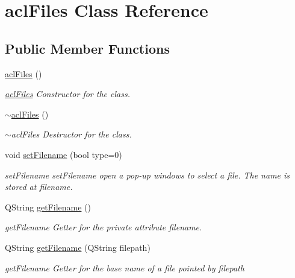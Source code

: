 \hypertarget{classaclFiles}{}\section{acl\+Files Class Reference}
\label{classaclFiles}
\subsection*{Public Member Functions}
\begin{DoxyCompactItemize}
\item 
\mbox{\label{classaclFiles_a624023b49f732728e4afea7e34e35ca9}} 
\hyperlink{classaclFiles_a624023b49f732728e4afea7e34e35ca9}{acl\+Files} ()
\begin{DoxyCompactList}\small\item\em \hyperlink{classaclFiles}{acl\+Files} Constructor for the class. \end{DoxyCompactList}\item 
\mbox{\label{classaclFiles_a775b6e59428624ce37d432d01b9b2421}} 
\hyperlink{classaclFiles_a775b6e59428624ce37d432d01b9b2421}{$\sim$acl\+Files} ()
\begin{DoxyCompactList}\small\item\em $\sim$acl\+Files Destructor for the class. \end{DoxyCompactList}\item 
void \hyperlink{classaclFiles_aa2948bd2ae50c0cd073da7ce73c5cbc5}{set\+Filename} (bool type=0)
\begin{DoxyCompactList}\small\item\em set\+Filename set\+Filename open a pop-\/up windows to select a file. The name is stored at filename. \end{DoxyCompactList}\item 
Q\+String \hyperlink{classaclFiles_a3ef3210f1bb426a0d4c02867780d861f}{get\+Filename} ()
\begin{DoxyCompactList}\small\item\em get\+Filename Getter for the private attribute filename. \end{DoxyCompactList}\item 
Q\+String \hyperlink{classaclFiles_a827c8b42e03850775de3feef9e14885d}{get\+Filename} (Q\+String filepath)
\begin{DoxyCompactList}\small\item\em get\+Filename Getter for the base name of a file pointed by filepath \end{DoxyCompactList}\item 

\end{DoxyCompactItemize}

